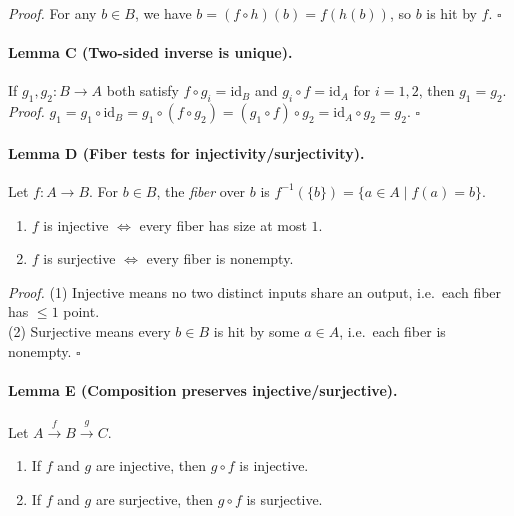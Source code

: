 \documentclass[12pt]{article}
\theoremstyle{definition}
\begin{document}
\emph{Proof.} For any \(b\in B\), we have \(b=(f\circ h)(b)=f(h(b))\), so \(b\) is hit by \(f\). \(\square\)

\dotfill

\paragraph{\textbf{Lemma C (Two-sided inverse is unique).}}

If \(g_1,g_2:B\to A\) both satisfy \(f\circ g_i=\mathrm{id}_B\) and \(g_i\circ f=\mathrm{id}_A\) for \(i=1,2\), then \(g_1=g_2\).\\

\emph{Proof.} \(g_1 = g_1\circ \mathrm{id}_B = g_1\circ (f\circ g_2) = (g_1\circ f)\circ g_2 = \mathrm{id}_A\circ g_2 = g_2\). \(\square\)

\dotfill

\paragraph{\textbf{Lemma D (Fiber tests for injectivity/surjectivity).}}

Let \(f:A\to B\). For \(b\in B\), the \emph{fiber} over \(b\) is \(f^{-1}(\{b\})=\{a\in A\mid f(a)=b\}\).

\begin{enumerate}
    \item \(f\) is injective \(\iff\) every fiber has size at most \(1\).
    \item \(f\) is surjective \(\iff\) every fiber is nonempty.
\end{enumerate}

\emph{Proof.} (1) Injective means no two distinct inputs share an output, i.e.\ each fiber has \(\le 1\) point.\\

\noindent
(2) Surjective means every \(b\in B\) is hit by some \(a\in A\), i.e.\ each fiber is nonempty. \(\square\)

\dotfill

\paragraph{\textbf{Lemma E (Composition preserves injective/surjective).}}

Let \(A\xrightarrow{f}B\xrightarrow{g}C\).

\begin{enumerate}
    \item If \(f\) and \(g\) are injective, then \(g\circ f\) is injective.
    \item If \(f\) and \(g\) are surjective, then \(g\circ f\) is surjective.
\end{enumerate}
\end{document}
